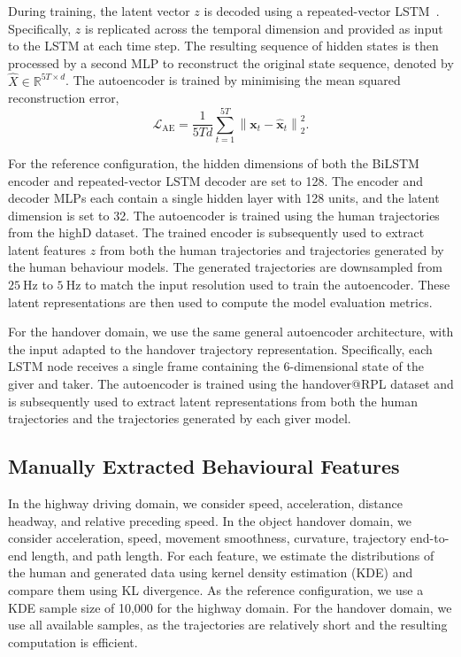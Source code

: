 \documentclass[journal]{IEEEtran}
\begin{document}
During training, the latent vector \(z\) is decoded using a repeated-vector LSTM~\cite{ghimire_StackedLSTMSequencetoSequence_2022}. Specifically, \(z\) is replicated across the temporal dimension and provided as input to the LSTM at each time step. The resulting sequence of hidden states is then processed by a second MLP to reconstruct the original state sequence, denoted by \(\hat{X} \in \mathbb{R}^{5T \times d}\). The autoencoder is trained by minimising the mean squared reconstruction error,
\begin{equation}
    \mathcal{L}_{\mathrm{AE}}
    =
    \frac{1}{5Td}
    \sum_{t=1}^{5T}
    \left\lVert
        \mathbf{x}_t - \hat{\mathbf{x}}_t
    \right\rVert_2^2.
\end{equation}

For the reference configuration, the hidden dimensions of both the BiLSTM encoder and repeated-vector LSTM decoder are set to 128. The encoder and decoder MLPs each contain a single hidden layer with 128 units, and the latent dimension is set to 32. The autoencoder is trained using the human trajectories from the highD dataset. The trained encoder is subsequently used to extract latent features \(z\) from both the human trajectories and trajectories generated by the human behaviour models. The generated trajectories are downsampled from \(25~\mathrm{Hz}\) to \(5~\mathrm{Hz}\) to match the input resolution used to train the autoencoder. These latent representations are then used to compute the model evaluation metrics.

For the handover domain, we use the same general autoencoder architecture, with the input adapted to the handover trajectory representation. Specifically, each LSTM node receives a single frame containing the 6-dimensional state of the giver and taker. The autoencoder is trained using the handover@RPL dataset and is subsequently used to extract latent representations from both the human trajectories and the trajectories generated by each giver model.

\subsection{Manually Extracted Behavioural Features}

In the highway driving domain, we consider speed, acceleration, distance headway, and relative preceding speed. In the object handover domain, we consider acceleration, speed, movement smoothness, curvature, trajectory end-to-end length, and path length. For each feature, we estimate the distributions of the human and generated data using kernel density estimation (KDE) and compare them using KL divergence. As the reference configuration, we use a KDE sample size of 10,000 for the highway domain. For the handover domain, we use all available samples, as the trajectories are relatively short and the resulting computation is efficient.
\end{document}
